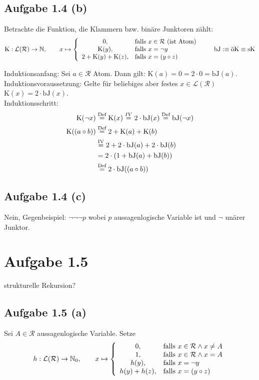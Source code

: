 \documentclass[12pt,a4paper]{article}
\newcommand{\ok}{\text{öK}}
\newcommand{\sk}{\text{sK}}
\renewcommand{\k}{\text{K}}
\newcommand{\bj}{\text{bJ}}
\begin{document}
\subsection*{Aufgabe 1.4 (b)}
Betrachte die Funktion, die Klammern bzw. binäre Junktoren zählt:
\begin{align*}
\k:\mathcal{L}(\mathcal{R})\to\N,\qquad
x\mapsto\left\lbrace\begin{array}{cl}
0, & \falls x\in\mathcal{R}\text{ (ist Atom)}\\
\k(y), & \falls x=\neg y\\
2+\k(y)+\k(z), & \falls x=(y\circ z)
\end{array}\right.\qquad \bj:\equiv \ok\equiv\sk
\end{align*}

Induktionsanfang: Sei $a\in\mathcal{R}$ Atom. Dann gilt: $\k(a)=0=2\cdot 0=\bj(a)$.\\
Induktionsvoraussetzung: Gelte für beliebiges aber festes $x\in\mathcal{L}(\mathcal{R})$ $\k(x)=2\cdot\bj(x)$.\\ 
Induktionsschritt:
\begin{align*}
\k(\neg x)
&\stackeq{\text{Def}}\k(x)
\stackeq{IV}2\cdot\bj(x)
\stackeq{\text{Def}}\bj(\neg x)\\
\k((a\circ b))
&\stackeq{\text{Def}}2+\k(a)+\k(b)\\
&\stackeq{\text{IV}}2+2\cdot\bj(a)+2\cdot\bj(b)\\
&=2\cdot(1+\bj(a)+\bj(b))\\
&\stackeq{\text{Def}}2\cdot\bj((a\circ b))
\end{align*}

\subsection*{Aufgabe 1.4 (c)}
Nein, Gegenbeispiel: $\neg\neg\neg p$ wobei  $p$ aussagenlogische Variable ist und $\neg$ unärer Junktor.

\section*{Aufgabe 1.5}
strukturelle Rekursion?
\subsection*{Aufgabe 1.5 (a)}
Sei $A\in\mathcal{R}$ aussagenlogische Variable. Setze
\begin{align*}
h:\mathcal{L}(\mathcal{R})\to\mathbb{N}_0,\qquad x\mapsto \left\lbrace\begin{array}{cl}
0, & \text{falls } x\in\mathcal{R}\wedge x\neq A\\
1, & \text{falls } x\in\mathcal{R}\wedge x=A\\
h(y), & \text{falls } x=\neg y\\
h(y)+h(z), & \text{falls } x=(y\circ z)
\end{array}\right.
\end{align*}
\end{document}

